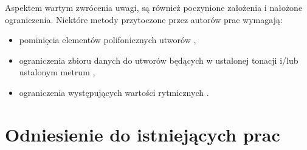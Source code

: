 {{    Aspektem wartym zwrócenia uwagi, są również poczynione założenia i nałożone
    ograniczenia. Niektóre metody przytoczone przez autorów prac wymagają:
    \begin{itemize}
      \setlength\itemsep{-0.5em}
      \item pominięcia elementów polifonicznych utworów \cite{Hadjeres2016DeepBachAS, Sturm2015FolkMS},
      \item ograniczenia zbioru danych do utworów będących w 
      ustalonej tonacji i/lub ustalonym metrum \cite{Sturm2015FolkMS, Wu2017AHR},
      \item ograniczenia występujących wartości rytmicznych \cite{Hadjeres2016DeepBachAS}.
    \end{itemize}
  }

  \section{Odniesienie do istniejących prac}
  {








  }

}
